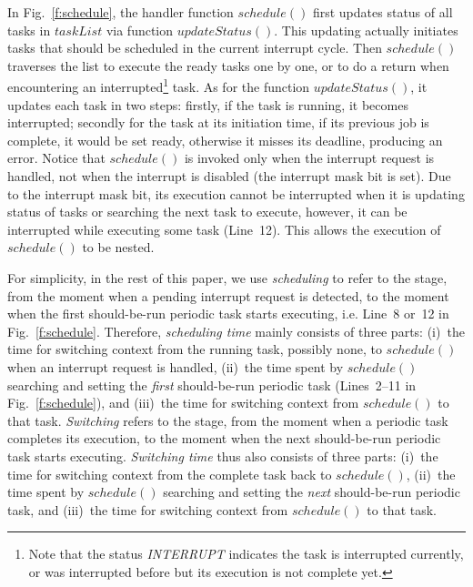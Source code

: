 \documentclass[journal]{IEEEtranTIE}
\begin{document}
In Fig.~\ref{f:schedule}, the handler function $\mathit{schedule()}$
first updates status of all tasks in $\mathit{taskList}$ via function
$\mathit{updateStatus()}$. This updating actually initiates tasks that
should be scheduled in the current interrupt cycle. Then
$\mathit{schedule()}$ traverses the list to execute the ready tasks
one by one, or to do a return when encountering an
interrupted\footnote{Note that the status \textit{INTERRUPT} indicates
  the task is interrupted currently, or was interrupted before but its
  execution is not complete yet.}  task. As for the function
$\mathit{updateStatus()}$, it updates each task in two steps: firstly,
if the task is running, it becomes interrupted; secondly for the task
at its initiation time, if its previous job is complete, it would be
set ready, otherwise it misses its deadline, producing an
error. Notice that $\mathit{schedule()}$ is invoked only when the
interrupt request is handled, not when the interrupt is disabled (the
interrupt mask bit is set). Due to the interrupt mask bit, its
execution cannot be interrupted when it is updating status of tasks or
searching the next task to execute, however, it can be interrupted
while executing some task (Line~12). This allows the execution of
$\mathit{schedule()}$ to be nested.

For simplicity, in the rest of this paper, we use \emph{scheduling} to
refer to the stage, from the moment when a pending interrupt request
is detected, to the moment when the first should-be-run periodic task
starts executing, i.e. Line~8 or~12 in
Fig.~\ref{f:schedule}. Therefore, \emph{scheduling time} mainly
consists of three parts: (i)~the time for switching context from the
running task, possibly none, to $\mathit{schedule()}$ when an
interrupt request is handled, (ii)~the time spent by
$\mathit{schedule()}$ searching and setting the \emph{first}
should-be-run periodic task (Lines~2--11 in Fig.~\ref{f:schedule}),
and (iii)~the time for switching context from $\mathit{schedule()}$ to
that task. \emph{Switching} refers to the stage, from the moment when
a periodic task completes its execution, to the moment when the next
should-be-run periodic task starts executing. \emph{Switching time}
thus also consists of three parts: (i)~the time for switching context
from the complete task back to $\mathit{schedule()}$, (ii)~the time
spent by $\mathit{schedule()}$ searching and setting the \emph{next}
should-be-run periodic task, and (iii)~the time for switching context
from $\mathit{schedule()}$ to that task.
\end{document}
